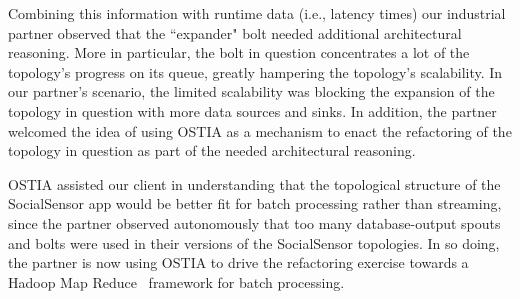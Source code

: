 \documentclass[smallextended]{svjour3}       %
\newcommand{\comment}[1]{{\textbf{\color{red}[#1]}}}
\newcommand{\todoMB}[2]{\linespread{0.7}\todo[color=yellow!50,#1]{\scriptsize\textbf{MB:}#2}}
\begin{document}
%




Combining this
information with runtime data (i.e., latency times) our industrial partner observed
that the ``expander" bolt needed additional architectural reasoning. More in particular, the bolt in question concentrates a lot of the topology's progress on its queue, greatly hampering the topology's scalability. In our partner's scenario, the limited scalability was blocking the expansion of the topology in question with more data sources and sinks.
In addition, the partner welcomed the idea of using OSTIA as a mechanism to enact the refactoring of the topology in question as part of the needed architectural
reasoning.

OSTIA assisted our client in understanding that the topological structure of the
SocialSensor app would be better fit for batch processing rather than streaming,
since the partner observed autonomously that too many database-output spouts and
bolts were used in their versions of the SocialSensor topologies. In so doing,
the partner is now using OSTIA to drive the refactoring exercise towards a
Hadoop Map Reduce~\cite{hadoop}
framework for batch processing.

\end{document}
